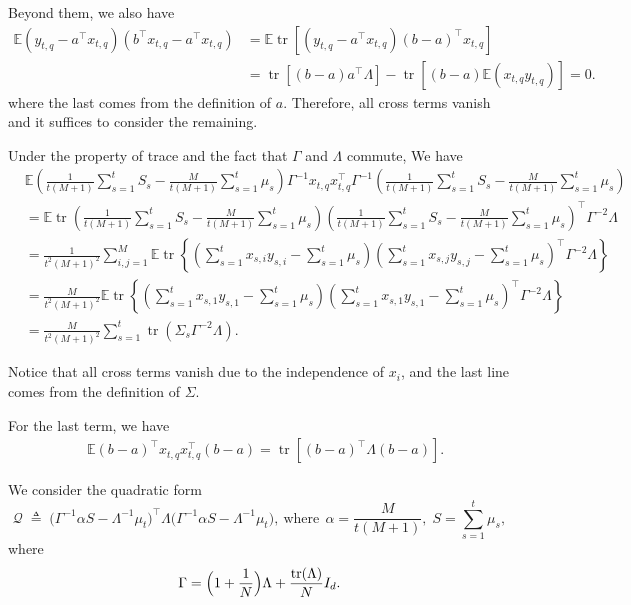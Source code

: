 \documentclass{article}
\theoremstyle{plain}
\theoremstyle{definition}
\theoremstyle{remark}
\begin{document}
Beyond them, we also have\begin{align*}
\mathbb{E}(y_{t,q} - a^\top x_{t,q})(b^\top x_{t,q}-a^\top x_{t,q}) &= \mathbb{E}\operatorname{tr}\left[ (y_{t,q} - a^\top x_{t,q})(b-a)^\top x_{t,q}\right] \\
&=\operatorname{tr}[(b-a)a^\top\Lambda] - \operatorname{tr}[(b-a)\mathbb{E}(x_{t,q}y_{t,q})] =0.
\end{align*}
where the last comes from the definition of $a$. Therefore, all cross terms vanish and it suffices to consider the remaining.

Under the property of trace and the fact that $\Gamma$ and $\Lambda$ commute, We have
\begin{align*}
    &\mathbb{E}\left(\frac{1}{t(M+1)}\sum_{s=1}^t S_s - \frac{M}{t(M+1)}\sum_{s=1}^t\mu_s\right)\Gamma^{-1}x_{t,q}x_{t,q}^\top\Gamma^{-1}\left(\frac{1}{t(M+1)}\sum_{s=1}^t S_s - \frac{M}{t(M+1)}\sum_{s=1}^t\mu_s\right)\\
    &=\mathbb{E}\operatorname{tr}\left(\frac{1}{t(M+1)}\sum_{s=1}^t S_s - \frac{M}{t(M+1)}\sum_{s=1}^t\mu_s\right)\left(\frac{1}{t(M+1)}\sum_{s=1}^t S_s - \frac{M}{t(M+1)}\sum_{s=1}^t\mu_s\right)^\top\Gamma^{-2}\Lambda \\
    &=\frac{1}{t^2(M+1)^2}\sum_{i,j=1}^M\mathbb{E}\operatorname{tr}\left\{(\sum_{s=1}^tx_{s,i}y_{s,i} - \sum_{s=1}^t\mu_s)(\sum_{s=1}^tx_{s,j}y_{s,j} - \sum_{s=1}^t\mu_s)^\top\Gamma^{-2}\Lambda\right\}\\
    &=\frac{M}{t^2(M+1)^2}\mathbb{E}\operatorname{tr}\left\{(\sum_{s=1}^tx_{s,1}y_{s,1} - \sum_{s=1}^t\mu_s)(\sum_{s=1}^tx_{s,1}y_{s,1} - \sum_{s=1}^t\mu_s)^\top\Gamma^{-2}\Lambda\right\}\\
    &=\frac{M}{t^2(M+1)^2}\sum_{s=1}^t\operatorname{tr}(\Sigma_s\Gamma^{-2}\Lambda).
\end{align*}

Notice that all cross terms vanish due to the independence of $x_i$, and the last line comes from the definition of $\Sigma$.

For the last term, we have\begin{align*}
    &\mathbb{E}(b-a)^\top x_{t,q}x_{t,q}^\top (b-a) =  \operatorname{tr}\left[(b-a)^\top\Lambda(b-a)\right]. 
\end{align*}

We consider the quadratic form
\[
\mathcal{Q}
\;\triangleq\;
\bigl(\Gamma^{-1}\alpha S - \Lambda^{-1}\mu_t\bigr)^\top
\Lambda
\bigl(\Gamma^{-1}\alpha S - \Lambda^{-1}\mu_t\bigr),\:
\text{where}\:\:\alpha = \frac{M}{t(M+1)},\;
S=\sum_{s=1}^t \mu_s,
\]
where
\[
\Gamma
= \Bigl(1+\frac{1}{N}\Bigr)\Lambda
+ \frac{\operatorname{tr}(\Lambda)}{N} I_d .
\]
\end{document}
